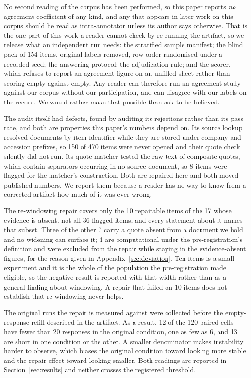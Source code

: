 \documentclass[11pt]{article}
\begin{document}
No second reading of the corpus has been performed, so this paper reports \emph{no} agreement
coefficient of any kind, and any that appears in later work on this corpus should be read as
intra-annotator unless its author says otherwise. That is the one part of this work a reader cannot
check by re-running the artifact, so we release what an independent run needs: the stratified
sample manifest; the blind pack of 154 items, original labels removed, row order randomised under
a recorded seed; the answering protocol; the adjudication rule; and the scorer, which refuses to
report an agreement figure on an unfilled sheet rather than scoring empty against empty. Any reader can therefore run an agreement study against our corpus without our
participation, and can disagree with our labels on the record. We would rather make that possible
than ask to be believed.

The audit itself had defects, found by auditing its rejections rather than its pass rate, and both
are properties this paper's numbers depend on. Its source lookup resolved documents by item
identifier while they are stored under company and accession prefixes, so 150 of 470 items were
never opened and their quote check silently did not run. Its quote matcher tested the raw text of
composite quotes, which contain separators occurring in no source document, so 8 items were flagged
for the matcher's construction. Both are repaired here and both moved published numbers. We report
them because a reader has no way to know from a corrected artifact how much of it was ever wrong.

The re-windowing repair covers only the 10 repairable items of the 17 whose evidence is absent, not
all 36 flagged items, and every statement about it names that subset. Three of the other 7 carry a
quote absent from a document we hold and no widening can surface it; 4 are computational under the
pre-registration's definition and were excluded from the repair while staying in the
evidence-absent figures, for the reason given in Appendix~\ref{sec:deviation}. Ten items is a small experiment and it is the whole of the population
the pre-registration made eligible, so the negative result is reported with that width rather than
as a general finding about windowing. A repair that failed on 10 items does not establish that
re-windowing never helps.

The original runs the repair is measured against were collected before the empty-response refill
described in the artifact. As a result, 12 of the 120 paired cells have fewer than 20 responses in
the original condition, one as few as 6, and 13 are short in one condition or the other. A smaller
denominator makes instability harder to observe, which biases the original condition toward
looking more stable and the repair effect toward looking smaller. Both readings are reported in Section~\ref{sec:results} and neither crosses
the registered threshold.
\end{document}
